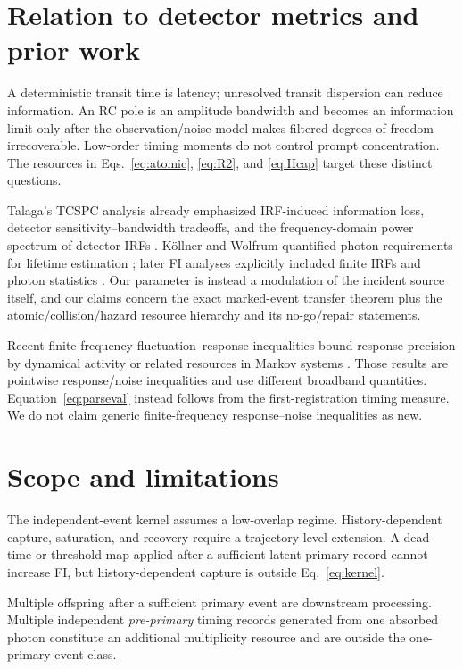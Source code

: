 \documentclass[aps,prapplied,preprint,nofootinbib]{revtex4-2}
\begin{document}
\section{Relation to detector metrics and prior work}

A deterministic transit time is latency; unresolved transit dispersion can reduce information. An RC pole is an amplitude bandwidth and becomes an information limit only after the observation/noise model makes filtered degrees of freedom irrecoverable. Low-order timing moments do not control prompt concentration. The resources in Eqs.~\eqref{eq:atomic}, \eqref{eq:R2}, and \eqref{eq:Hcap} target these distinct questions.

Talaga's TCSPC analysis already emphasized IRF-induced information loss, detector sensitivity--bandwidth tradeoffs, and the frequency-domain power spectrum of detector IRFs \cite{Talaga2009}. K\"ollner and Wolfrum quantified photon requirements for lifetime estimation \cite{KollnerWolfrum1992}; later FI analyses explicitly included finite IRFs and photon statistics \cite{Bouchet2019,TrinhEsposito2021}. Our parameter is instead a modulation of the incident source itself, and our claims concern the exact marked-event transfer theorem plus the atomic/collision/hazard resource hierarchy and its no-go/repair statements.

Recent finite-frequency fluctuation--response inequalities bound response precision by dynamical activity or related resources in Markov systems \cite{Dechant2026}. Those results are pointwise response/noise inequalities and use different broadband quantities. Equation~\eqref{eq:parseval} instead follows from the first-registration timing measure. We do not claim generic finite-frequency response--noise inequalities as new.

\section{Scope and limitations}

The independent-event kernel assumes a low-overlap regime. History-dependent capture, saturation, and recovery require a trajectory-level extension. A dead-time or threshold map applied after a sufficient latent primary record cannot increase FI, but history-dependent capture is outside Eq.~\eqref{eq:kernel}.

Multiple offspring after a sufficient primary event are downstream processing. Multiple independent \emph{pre-primary} timing records generated from one absorbed photon constitute an additional multiplicity resource and are outside the one-primary-event class.
\end{document}
